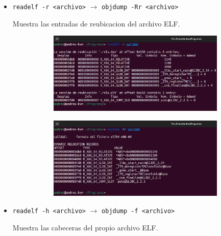 \documentclass{article}
\begin{document}
\begin{itemize}
    \item \verb|readelf -r <archivo>| $\rightarrow$ \verb|objdump -Rr <archivo>|
    
    
    Muestra las entradas de reubicacion del archivo ELF.

    \begin{figure}[H]
        \centering
        \begin{subfigure}{0.49\textwidth}
            \centering
            \includegraphics[width=\textwidth]{imagenes/Captura desde 2022-11-17 17-42-30.png}
        \end{subfigure}
        \hfill
        \begin{subfigure}{0.49\textwidth}
            \centering
            \includegraphics[width=\textwidth]{imagenes/Captura desde 2022-11-17 17-42-36.png}
        \end{subfigure}
    \end{figure}

    \item \verb|readelf -h <archivo>| $\rightarrow$ \verb|objdump -f <archivo>|
    
    Muestra las cabeceras del propio archivo ELF.


\end{itemize}
\end{document}
